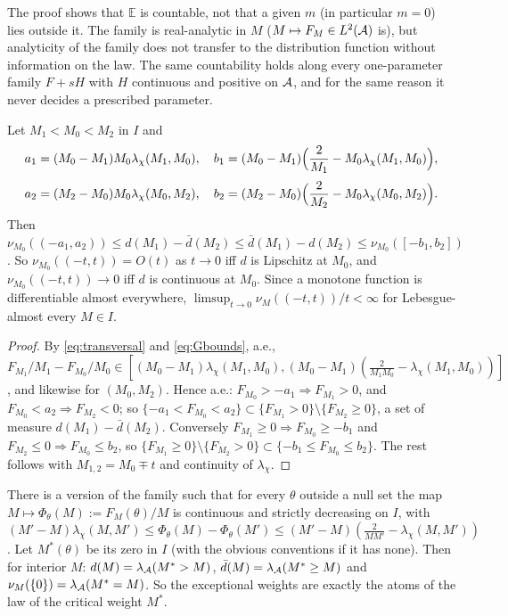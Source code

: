 \begin{remark}
The proof shows that $\mathbb E$ is countable, not that a given $m$ (in particular $m=0$) lies outside it. The family is real-analytic in $M$ ($M\mapsto F_M\in L^2(\mathcal A)$ is), but analyticity of the family does not transfer to the distribution function without information on the law. The same countability holds along every one-parameter family $F+sH$ with $H$ continuous and positive on $\mathcal A$, and for the same reason it never decides a prescribed parameter.
\end{remark}

\begin{theorem}\label{thm:twosided}
Let $M_1<M_0<M_2$ in $I$ and
\[
a_1=(M_0-M_1)M_0\lambda_\chi(M_1,M_0),\quad b_1=(M_0-M_1)\Bigl(\frac2{M_1}-M_0\lambda_\chi(M_1,M_0)\Bigr),
\]
\[
a_2=(M_2-M_0)M_0\lambda_\chi(M_0,M_2),\quad b_2=(M_2-M_0)\Bigl(\frac2{M_2}-M_0\lambda_\chi(M_0,M_2)\Bigr).
\]
Then $\nu_{M_0}((-a_1,a_2))\le d(M_1)-\bar d(M_2)\le\bar d(M_1)-d(M_2)\le\nu_{M_0}([-b_1,b_2])$. So $\nu_{M_0}((-t,t))=O(t)$ as $t\to0$ iff $d$ is Lipschitz at $M_0$, and $\nu_{M_0}((-t,t))\to0$ iff $d$ is continuous at $M_0$. Since a monotone function is differentiable almost everywhere, $\limsup_{t\to0}\nu_M((-t,t))/t<\infty$ for Lebesgue-almost every $M\in I$.
\end{theorem}

\begin{proof}
By \eqref{eq:transversal} and \eqref{eq:Gbounds}, a.e., $F_{M_1}/M_1-F_{M_0}/M_0\in[(M_0-M_1)\lambda_\chi(M_1,M_0),(M_0-M_1)(\frac2{M_1M_0}-\lambda_\chi(M_1,M_0))]$, and likewise for $(M_0,M_2)$. Hence a.e.: $F_{M_0}>-a_1\Rightarrow F_{M_1}>0$, and $F_{M_0}<a_2\Rightarrow F_{M_2}<0$; so $\{-a_1<F_{M_0}<a_2\}\subset\{F_{M_1}>0\}\setminus\{F_{M_2}\ge0\}$, a set of measure $d(M_1)-\bar d(M_2)$. Conversely $F_{M_1}\ge0\Rightarrow F_{M_0}\ge-b_1$ and $F_{M_2}\le0\Rightarrow F_{M_0}\le b_2$, so $\{F_{M_1}\ge0\}\setminus\{F_{M_2}>0\}\subset\{-b_1\le F_{M_0}\le b_2\}$. The rest follows with $M_{1,2}=M_0\mp t$ and continuity of $\lambda_\chi$.
\end{proof}

\begin{proposition}\label{prop:critical}
There is a version of the family such that for every $\theta$ outside a null set the map $M\mapsto\Phi_\theta(M):=F_M(\theta)/M$ is continuous and strictly decreasing on $I$, with $(M'-M)\lambda_\chi(M,M')\le\Phi_\theta(M)-\Phi_\theta(M')\le(M'-M)(\frac2{MM'}-\lambda_\chi(M,M'))$. Let $M^*(\theta)$ be its zero in $I$ (with the obvious conventions if it has none). Then for interior $M$: $d(M)=\lambda_{\mathcal A}(M^*>M)$, $\bar d(M)=\lambda_{\mathcal A}(M^*\ge M)$ and $\nu_M(\{0\})=\lambda_{\mathcal A}(M^*=M)$. So the exceptional weights are exactly the atoms of the law of the critical weight $M^*$.
\end{proposition}

